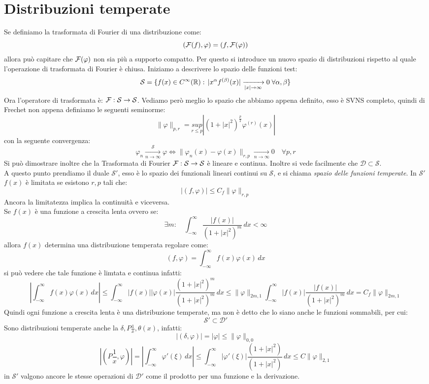 \section{Distribuzioni temperate}
Se definiamo la trasformata di Fourier di una distribuzione come:
\[(\mathcal{F}(f),\varphi) = (f,\mathcal{F}(\varphi))\]
allora può capitare che $\mathcal{F}(\varphi)$ non sia più a supporto compatto. Per questo si introduce un nuovo spazio di distribuzioni rispetto al quale l'operazione di trasformata di Fourier è chiusa.
Iniziamo a descrivere lo spazio delle funzioni test:
\[\mathcal{S} = \{f(x)\in C^\infty(\mathbb{R}):\, |x^\alpha f^{(\beta)}(x)|\xrightarrow[|x|\to \infty]{} 0 \;\forall\alpha,\beta  \} \]
Ora l'operatore di trasformata è: $\mathcal{F}:\mathcal{S}\to\mathcal{S}$. Vediamo però meglio lo spazio che abbiamo appena definito, esso è SVNS completo, quindi di Frechet non appena definiamo le seguenti seminorme:
\[\|\varphi\|_{p,r} =  \underset{r\leq p }{sup}\left|(1+|x|^2)^{\frac{p}{2}}\varphi^{(r)}(x)\right|\]
con la seguente convergenza:
\[\varphi_n \xrightarrow[n\to \infty]{\mathcal{S}} \varphi \iff \|\varphi_n(x)-\varphi(x)\|_{r,p} \xrightarrow[n\to\infty]{} 0\quad \forall p,r \]
Si può dimostrare inoltre che la Trasformata di Fourier $\mathcal{F}:\mathcal{S}\to\mathcal{S}$ è lineare e continua. Inoltre si vede facilmente che $\mathcal{D}\subset\mathcal{S}$.\\
A questo punto prendiamo il duale $\mathcal{S}'$, esso è lo spazio dei funzionali lineari continui su $\mathcal{S}$, e si chiama \emph{spazio delle funzioni temperate}. In $\mathcal{S}'$ $f(x)$ è limitata se esistono $r,p$ tali che:
\[|(f,\varphi)|\leq C_f \|\varphi\|_{r,p}\]
Ancora la limitatezza implica la continuità e viceversa.\\
Se $f(x)$ è una funzione a crescita lenta ovvero se:
\[\exists m :\quad \int_{-\infty}^\infty \frac{|f(x)|}{(1+|x|^2)^{m}}\,dx <\infty\]
allora $f(x)$ determina una distribuzione temperata regolare come:
\[(f,\varphi) = \int_{-\infty}^\infty f(x)\varphi(x)\,dx\]
si può vedere che tale funzione è limtata e continua infatti:
\[ \left|\int_{-\infty}^\infty f(x)\varphi(x)\,dx\right|\leq \int_{-\infty}^\infty |f(x)||\varphi(x)|\frac{(1+|x|^2)^{m}}{(1+|x|^2)^{m}}\,dx \leq \|\varphi\|_{2m,1}\int_{-\infty}^\infty |f(x)| \frac{|f(x)|}{(1+|x|^2)^{m}}\,dx = C_f\|\varphi\|_{2m,1}\]
Quindi ogni funzione a crescita lenta è una distribuzione temperate, ma non è detto che lo siano anche le funzioni sommabili, per cui:
\[\mathcal{S}'\subset\mathcal{D}'\]
Sono distribuzioni temperate anche la $\delta,P\frac{1}{x},\theta(x)$, infatti:
\[|(\delta,\varphi)| = |\varphi|\leq \|\varphi\|_{0,0}\]
\[\left|\left(P\frac{1}{x},\varphi\right)\right| = \left|\int_{-\infty}^\infty \varphi'(\xi)\,dx \right| \leq \int_{-\infty}^\infty |\varphi'(\xi)|\frac{(1+|x|^2)}{(1+|x|^2)} \,dx\leq C\|\varphi\|_{2,1}\]
in $\mathcal{S}'$ valgono ancore le stesse operazioni di $\mathcal{D}'$ come il prodotto per una funzione e la derivazione.
